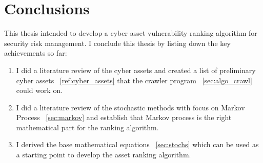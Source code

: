 \section{Conclusions}\label{sec:conclusions}
This thesis intended to develop a cyber asset vulnerability ranking algorithm for security risk management.  I conclude this thesis by listing down the key achievements so far:
\begin{enumerate}
        \item I did a literature review of the cyber assets and created a list of preliminary cyber assets ~\ref{ref:cyber_assets} that the crawler program ~\ref{sec:algo_crawl} could work on.
        \item I did a literature review of the stochastic methods with focus on Markov Process ~\ref{sec:markov} and establish that Markov process is the right mathematical part for the ranking algorithm.
        \item I derived the base mathematical equations ~\ref{sec:stochs} which can be used as a starting point to develop the asset ranking algorithm.
\end{enumerate}

%
